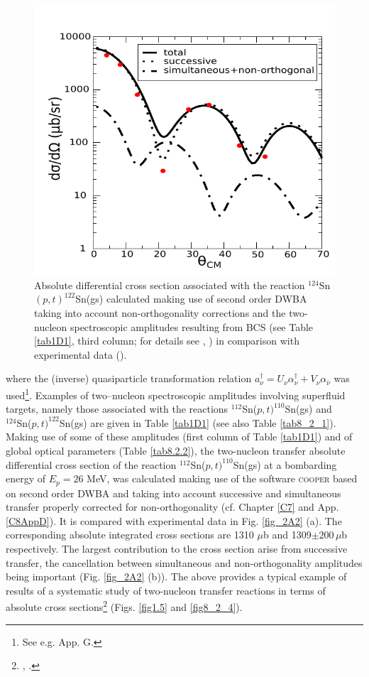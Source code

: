 \begin{figure}\label{fig2A3}
\centerline{\includegraphics*[width=\textwidth,angle=0]{nutshell/figs/fig2A3_v2}}
\caption{Absolute differential cross section associated with the reaction $^{124}$Sn$(p,t)^{122}$Sn(gs) calculated making use of second order DWBA taking into account non-orthogonality corrections and the two-nucleon spectroscopic amplitudes resulting from BCS (see Table \ref{tab1D1}, third column; for details see \cite{Potel:13}, \cite{Potel:13b}) in comparison with experimental data (\cite{Guazzoni:11}).}\label{fig_2A3}
\end{figure}
where the (inverse) quasiparticle transformation relation $a^{\dagger}_\nu=U_{\nu}\alpha^{\dagger}_{\nu}+V_{\nu}\alpha_{\bar{\nu}}$ was used\footnote{See e.g. \cite{Brink:05} App. G.}. Examples of  two--nucleon spectroscopic amplitudes involving superfluid targets, namely those associated with the reactions $^{112}$Sn($p,t)^{110}$Sn(gs) and\\ $^{124}$Sn($p,t)^{122}$Sn(gs) are given in Table \ref{tab1D1} (see also Table \ref{tab8_2_1}). Making use of some of these amplitudes (first column of Table \ref{tab1D1}) and of global optical parameters (Table \ref{tab8.2.2}), the two-nucleon transfer absolute differential cross section of the reaction $^{112}$Sn($p,t)^{110}$Sn(gs) at a bombarding energy of $E_p=26$ MeV, was calculated making use of the software \textsc{cooper} based on second order DWBA and taking into account successive and simultaneous transfer properly corrected for non-orthogonality (cf. Chapter \ref{C7} and App. \ref{C8AppD}). It is compared with experimental data in Fig. \ref{fig_2A2} (a). The corresponding absolute integrated cross sections are 1310 $\mu$b and 1309$\pm 200 \,\mu$b respectively. The largest contribution to the cross section  arise from successive transfer, the cancellation between simultaneous and non-orthogonality amplitudes being important (Fig. \ref{fig_2A2} (b)). The above provides a typical example of results of a systematic study of two-nucleon transfer reactions in terms of absolute cross sections\footnote{\cite{Potel:13}, \cite{Potel:13b}.} (Figs. \ref{fig1.5} and  \ref{fig8_2_4}).




